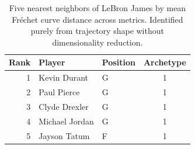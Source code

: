 \begin{table}[htbp]
  \centering\small
  \begin{tabular}{rllc}
    \toprule
    Rank & Player & Position & Archetype \\
    \midrule
    1 & Kevin Durant & G & 1 \\
    2 & Paul Pierce & G & 1 \\
    3 & Clyde Drexler & G & 1 \\
    4 & Michael Jordan & G & 1 \\
    5 & Jayson Tatum & F & 1 \\
    \bottomrule
  \end{tabular}
  \caption{Five nearest neighbors of LeBron James by mean Fr\'{e}chet curve distance across metrics. Identified purely from trajectory shape without dimensionality reduction.}
  \label{tab:LeBron_James_frechet_curve_neighbors}
\end{table}

